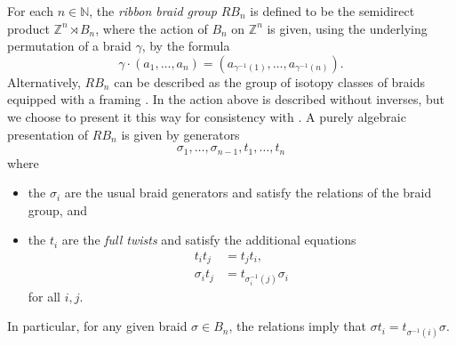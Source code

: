 \begin{example}\label{example:aop-rbraid}
For each $n \in \mathbb{N}$, the \emph{ribbon braid group} $RB_{n}$ is defined to be the semidirect product $\mathbb{Z}^n \rtimes B_n$, where the action of $B_n$ on $\mathbb{Z}^n$ is given, using the underlying permutation of a braid $\gamma$, by the formula
\[
\gamma \cdot (a_1, \ldots, a_n) = (a_{\gamma^{-1}(1)}, \ldots, a_{\gamma^{-1}(n)}).
\]
Alternatively, $RB_n$ can be described as the group of isotopy classes of braids equipped with a framing \cite{KS-framed,KS-framed2,MT-framed}. In \cite{KS-framed,KS-framed2} the action above is described without inverses, but we choose to present it this way for consistency with . A purely algebraic presentation of $RB_n$ is given by generators
    \[
        \sigma_1, \ldots, \sigma_{n-1}, t_1, \ldots, t_n
    \]
where 
\begin{itemize}
\item the $\sigma_i$ are the usual braid generators and satisfy the relations of the braid group, and 
\item the $t_i$ are the \emph{full twists} and satisfy the additional equations
\begin{align*}
t_i t_j & = t_j t_i, \\
\sigma_i t_j & = t_{\sigma_i^{-1}(j)} \sigma_i
\end{align*}
for all $i, j$.
\end{itemize}
In particular, for any given braid $\sigma \in B_n$, the relations imply that $\sigma t_i = t_{\sigma^{-1}(i)} \sigma$.


\end{example}
